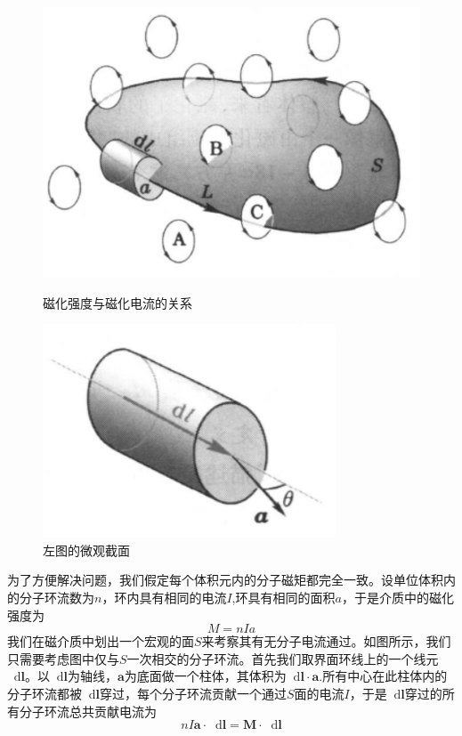 \documentclass[12pt,a4paper,oneside]{report}
\theoremstyle{definition}
\theoremstyle{remark}
\renewcommand{\d}{\mathop{}\!\mathrm{d}}
\begin{document}
\begin{figure}[h]
  \centering
  \begin{minipage}[t]{0.4\textwidth}
    \centering
    \includegraphics[width=\textwidth]{3-2.png}
    \caption{磁化强度与磁化电流的关系}
  \end{minipage}
  \hfill
  \begin{minipage}[t]{0.4\textwidth}
    \centering
    \includegraphics[width=\textwidth]{3-3.png}
    \caption{左图的微观截面}
  \end{minipage}
\end{figure}

为了方便解决问题，我们假定每个体积元内的分子磁矩都完全一致。设单位体积内的分子环流数为$n$，环内具有相同的电流$I$,环具有相同的面积$a$，于是介质中的磁化强度为
\[
M= nIa 
\]
我们在磁介质中划出一个宏观的面$S$来考察其有无分子电流通过。如图所示，我们只需要考虑图中仅与$S$一次相交的分子环流。首先我们取界面环线上的一个线元$\d \mathbf{l}$。以$\d \mathbf{l}$为轴线，$\mathbf{a}$为底面做一个柱体，其体积为$\d \mathbf{l}\cdot \mathbf{a}$.所有中心在此柱体内的分子环流都被$\d \mathbf{l}$穿过，每个分子环流贡献一个通过$S$面的电流$I$，于是$\d \mathbf{l}$穿过的所有分子环流总共贡献电流为
\[ n I \mathbf{a}\cdot \d \mathbf{l}=\mathbf{M}\cdot \d\mathbf{l}\]
\end{document}
